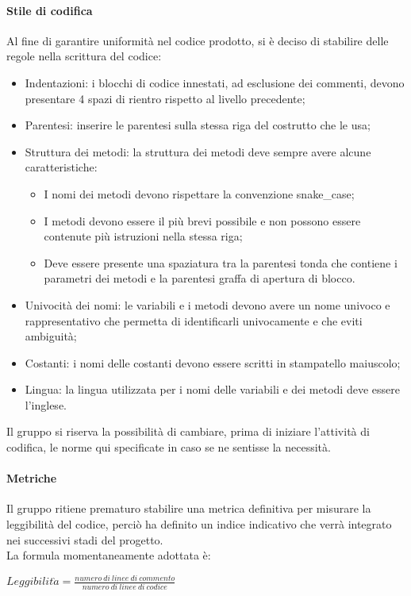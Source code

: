 \paragraph{Stile di codifica}
\label{par:stile_codifica}
Al fine di garantire uniformità nel codice prodotto, si è deciso di stabilire delle regole nella scrittura del codice:
\begin{itemize}
    \item Indentazioni: i blocchi di codice innestati, ad esclusione dei commenti, devono presentare 4 spazi di rientro 
    rispetto al livello precedente;
    \item Parentesi: inserire le parentesi sulla stessa riga del costrutto che le usa;
    \item Struttura dei metodi: la struttura dei metodi deve sempre avere alcune caratteristiche:
    \begin{itemize}
        \item I nomi dei metodi devono rispettare la convenzione snake\_case;
        \item I metodi devono essere il più brevi possibile e non possono essere contenute più istruzioni nella stessa 
        riga;
        \item Deve essere presente una spaziatura tra la parentesi tonda che contiene i parametri dei metodi e la 
        parentesi graffa di apertura di blocco.
    \end{itemize}
    \item Univocità dei nomi: le variabili e i metodi devono avere un nome univoco e rappresentativo che permetta di 
    identificarli univocamente e che eviti ambiguità;
    \item Costanti: i nomi delle costanti devono essere scritti in stampatello maiuscolo;
    \item Lingua: la lingua utilizzata per i nomi delle variabili e dei metodi deve essere l'inglese.
\end{itemize}
Il gruppo si riserva la possibilità di cambiare, prima di iniziare l'attività di codifica, le norme qui specificate in 
caso se ne sentisse la necessità.

\paragraph{Metriche}

Il gruppo ritiene prematuro stabilire una metrica definitiva per misurare la leggibilità del codice, perciò ha definito 
un indice indicativo che verrà integrato nei successivi stadi del progetto.\\
La formula momentaneamente adottata è:
\begin{center}
    $Leggibilit\grave{a} = \frac{numero\ di\ linee\ di\ commento}{numero\ di\ linee\ di\ codice}$
\end{center}

